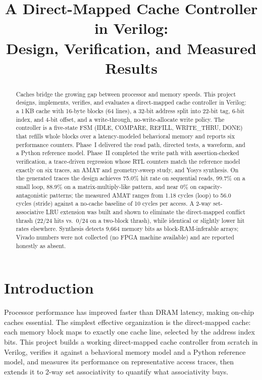 \documentclass[conference]{IEEEtran}
\begin{document}
\title{A Direct-Mapped Cache Controller in Verilog:\\
Design, Verification, and Measured Results}

\author{
}

\maketitle

\begin{abstract}
Caches bridge the growing gap between processor and memory speeds. This
project designs, implements, verifies, and evaluates a direct-mapped cache
controller in Verilog: a 1\,KB cache with 16-byte blocks (64 lines), a 32-bit
address split into 22-bit tag, 6-bit index, and 4-bit offset, and a
write-through, no-write-allocate write policy. The controller is a five-state
FSM (IDLE, COMPARE, REFILL, WRITE\_THRU, DONE) that refills whole blocks over
a latency-modeled behavioral memory and reports six performance counters.
Phase~I delivered the read path, directed tests, a waveform, and a Python
reference model. Phase~II completed the write path with assertion-checked
verification, a trace-driven regression whose RTL counters match the
reference model exactly on six traces, an AMAT and geometry-sweep study, and
Yosys synthesis. On the generated traces the design achieves 75.0\% hit rate
on sequential reads, 99.7\% on a small loop, 88.9\% on a matrix-multiply-like
pattern, and near 0\% on capacity-antagonistic patterns; the measured AMAT
ranges from 1.18 cycles (loop) to 56.0 cycles (stride) against a no-cache
baseline of 10 cycles per access. A 2-way set-associative LRU extension was
built and shown to eliminate the direct-mapped conflict thrash (22/24 hits
vs.\ 0/24 on a two-block thrash), while identical or slightly lower hit rates
elsewhere. Synthesis detects 9{,}664 memory bits as block-RAM-inferable
arrays; Vivado numbers were not collected (no FPGA machine available) and are
reported honestly as absent.
\end{abstract}

\section{Introduction}
Processor performance has improved faster than DRAM latency, making on-chip
caches essential. The simplest effective organization is the direct-mapped
cache: each memory block maps to exactly one cache line, selected by the
address index bits. This project builds a working direct-mapped cache
controller from scratch in Verilog, verifies it against a behavioral memory
model and a Python reference model, and measures its performance on
representative access traces, then extends it to 2-way set associativity to
quantify what associativity buys.
\end{document}
